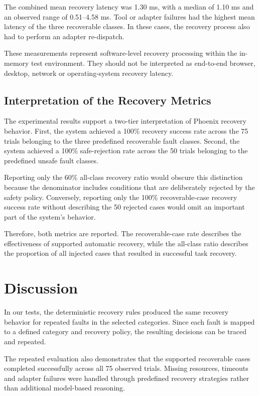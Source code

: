 \documentclass[conference]{IEEEtran}
\begin{document}
The combined mean recovery latency was 1.30 ms, with a median of 1.10 ms and an observed range of 0.51--4.58 ms. Tool or adapter failures had the highest mean latency of the three recoverable classes. In these cases, the recovery process also had to perform an adapter re-dispatch.

These measurements represent software-level recovery processing within the in-memory test environment. They should not be interpreted as end-to-end browser, desktop, network or operating-system recovery latency.

\subsection{Interpretation of the Recovery Metrics}
The experimental results support a two-tier interpretation of Phoenix recovery behavior. First, the system achieved a 100\% recovery success rate across the 75 trials belonging to the three predefined recoverable fault classes. Second, the system achieved a 100\% safe-rejection rate across the 50 trials belonging to the predefined unsafe fault classes.

Reporting only the 60\% all-class recovery ratio would obscure this distinction because the denominator includes conditions that are deliberately rejected by the safety policy. Conversely, reporting only the 100\% recoverable-case recovery success rate without describing the 50 rejected cases would omit an important part of the system's behavior.

Therefore, both metrics are reported. The recoverable-case rate describes the effectiveness of supported automatic recovery, while the all-class ratio describes the proportion of all injected cases that resulted in successful task recovery.

\section{Discussion}
In our tests, the deterministic recovery rules produced the same recovery behavior for repeated faults in the selected categories. Since each fault is mapped to a defined category and recovery policy, the resulting decisions can be traced and repeated.

The repeated evaluation also demonstrates that the supported recoverable cases completed successfully across all 75 observed trials. Missing resources, timeouts and adapter failures were handled through predefined recovery strategies rather than additional model-based reasoning.
\end{document}
